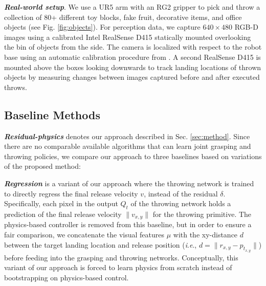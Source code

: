 \documentclass[journal]{IEEEtran}
\newcommand{\ie}{\textit{i}.\textit{e}., }
\newcommand{\mypara}[1]{\par\vspace*{0.8mm}\noindent\textbf{\textit{#1}}}
\newcommand{\johnny}{\textcolor{green}{JL: }\textcolor{green}}
\begin{document}
\mypara{Real-world setup}. %
We use a UR5 arm with an RG2 gripper to pick and throw a collection of 80+ different toy blocks, fake fruit, decorative items, and office objects (see Fig. \ref{fig:objects}). For perception data, we capture $640\times480$ RGB-D images using a calibrated Intel RealSense D415 statically mounted overlooking the bin of objects from the side. The camera is localized with respect to the robot base using an automatic calibration procedure from \cite{zeng2018learning}. A second RealSense D415 is mounted above the boxes looking downwards to track landing locations of thrown objects by measuring changes between images captured before and after executed throws. %
  

\subsection{Baseline Methods}
\label{sec:evaluation-baselines}

\mypara{Residual-physics} denotes our approach described in Sec. \ref{sec:method}. Since there are no comparable available algorithms that can learn joint grasping and throwing policies, we compare our approach to three baselines based on variations of the proposed method:

\mypara{Regression} is a variant of our approach where the throwing network is trained to directly regress the final release velocity $v$, instead of the residual $\delta$. Specifically, each pixel in the output $Q_t$ of the throwing network holds a prediction of the final release velocity $\|v_{x,y}\|$ for the throwing primitive. The physics-based controller is removed from this baseline, but in order to ensure a fair comparison, we concatenate the visual features $\mu$ with the xy-distance $d$ between the target landing location and release position (\ie $d=\|r_{x,y}-p_{t_{x,y}}\|$) before feeding into the grasping and throwing networks. Conceptually, this variant of our approach is forced to learn physics from scratch instead of bootstrapping on physics-based control.
\end{document}
